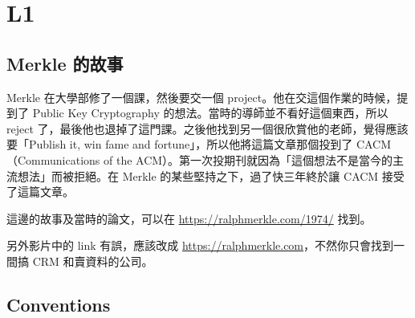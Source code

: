 \section{L1}


\subsection{Merkle 的故事}

Merkle 在大學部修了一個課，然後要交一個 project。他在交這個作業的時候，提到了 Public Key Cryptography 的想法。當時的導師並不看好這個東西，所以 reject 了，最後他也退掉了這門課。之後他找到另一個很欣賞他的老師，覺得應該要「Publish it, win fame and fortune」，所以他將這篇文章那個投到了 CACM（Communications of the ACM）。第一次投期刊就因為「這個想法不是當今的主流想法」而被拒絕。在 Merkle 的某些堅持之下，過了快三年終於讓 CACM 接受了這篇文章。

這邊的故事及當時的論文，可以在 \url{https://ralphmerkle.com/1974/} 找到。

另外影片中的 link 有誤，應該改成 \url{https://ralphmerkle.com}，不然你只會找到一間搞 CRM 和賣資料的公司。


\subsection{Conventions}

